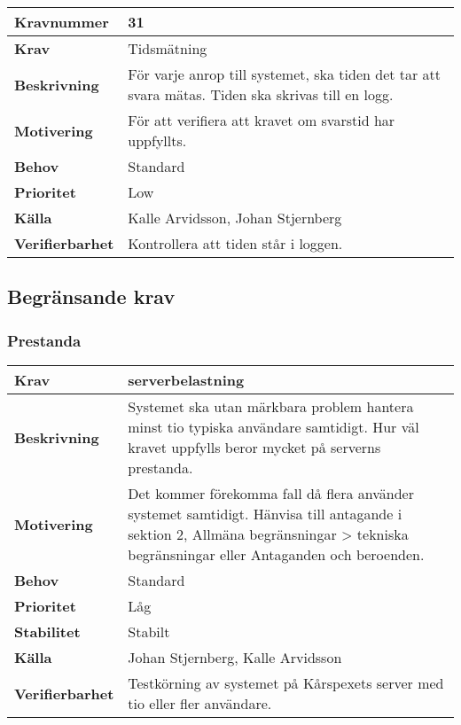 \documentclass[a4paper, twoside, 11pt, titlepage]{article}
\begin{document}
\begin{tabular} { | p{3cm} | p{12.2cm} | }
	\hline
	\textbf{Kravnummer} & 31  \\
	\hline
	\textbf{Krav} & Tidsmätning  \\
	\hline
	\textbf{Beskrivning} & För varje anrop till systemet, ska tiden det tar att svara mätas. Tiden ska skrivas till en logg.  \\
	\hline
	\textbf{Motivering} & För att verifiera att kravet om svarstid har uppfyllts.  \\
	\hline
	\textbf{Behov} & Standard  \\
	\hline
	\textbf{Prioritet} & Low  \\
	\hline
	\textbf{Källa} & Kalle Arvidsson, Johan Stjernberg  \\
	\hline
	\textbf{Verifierbarhet} & Kontrollera att tiden står i loggen.  \\
	\hline
\end{tabular}


	\subsection{Begränsande krav}



	\subsubsection{Prestanda}


		\begin{tabular} { | p{3cm} | p{12.2cm} | }
			\hline
			\textbf{Krav} & serverbelastning  \\
			\hline
			\textbf{Beskrivning} & Systemet ska utan märkbara problem hantera minst tio typiska användare samtidigt. Hur väl kravet uppfylls beror mycket på serverns prestanda.  \\
			\hline
			\textbf{Motivering} & Det kommer förekomma fall då flera använder systemet samtidigt. Hänvisa till antagande i sektion 2, Allmäna begränsningar > tekniska begränsningar eller Antaganden och beroenden.  \\
			\hline
			\textbf{Behov} & Standard  \\
			\hline
			\textbf{Prioritet} & Låg  \\
			\hline
			\textbf{Stabilitet} & Stabilt  \\
			\hline
			\textbf{Källa} & Johan Stjernberg, Kalle Arvidsson  \\
			\hline
			\textbf{Verifierbarhet} & Testkörning av systemet på Kårspexets server med tio eller fler användare.  \\
			\hline
		\end{tabular}
\end{document}
